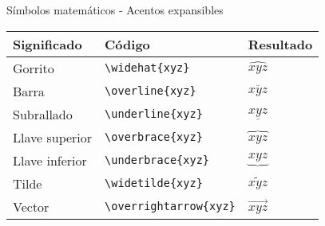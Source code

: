 \documentclass[
  ignorenonframetext,
]{beamer}
\begin{document}
\begin{frame}[fragile]{Símbolos matemáticos - Acentos expansibles}
\protect\hypertarget{suxedmbolos-matemuxe1ticos---acentos-expansibles}{}
\begin{longtable}[]{@{}lll@{}}
\toprule
Significado & Código & Resultado\tabularnewline
\midrule
\endhead
Gorrito & \texttt{\textbackslash{}widehat\{xyz\}} &
\(\widehat{xyz}\)\tabularnewline
Barra & \texttt{\textbackslash{}overline\{xyz\}} &
\(\overline{xyz}\)\tabularnewline
Subrallado & \texttt{\textbackslash{}underline\{xyz\}} &
\(\underline{xyz}\)\tabularnewline
Llave superior & \texttt{\textbackslash{}overbrace\{xyz\}} &
\(\overbrace{xyz}\)\tabularnewline
Llave inferior & \texttt{\textbackslash{}underbrace\{xyz\}} &
\(\underbrace{xyz}\)\tabularnewline
Tilde & \texttt{\textbackslash{}widetilde\{xyz\}} &
\(\widetilde{xyz}\)\tabularnewline
Vector & \texttt{\textbackslash{}overrightarrow\{xyz\}} &
\(\overrightarrow{xyz}\)\tabularnewline
\bottomrule
\end{longtable}
\end{frame}
\end{document}
